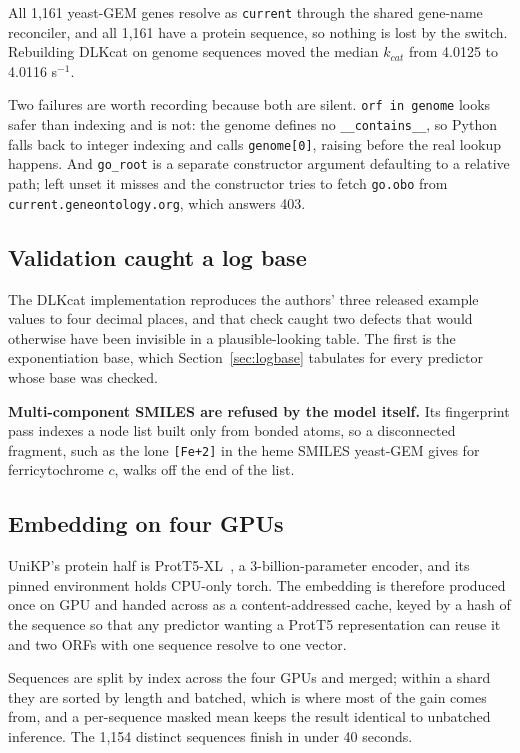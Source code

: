 All 1{,}161 yeast-GEM genes resolve as \texttt{current} through the shared gene-name
reconciler, and all 1{,}161 have a protein sequence, so nothing is lost by the switch.
Rebuilding DLKcat on genome sequences moved the median $k_{cat}$ from 4.0125 to 4.0116
s$^{-1}$.

Two failures are worth recording because both are silent. \texttt{orf in genome} looks
safer than indexing and is not: the genome defines no \texttt{\_\_contains\_\_}, so Python
falls back to integer indexing and calls \texttt{genome[0]}, raising before the real lookup
happens. And \texttt{go\_root} is a separate constructor argument defaulting to a relative
path; left unset it misses and the constructor tries to fetch \texttt{go.obo} from
\texttt{current.geneontology.org}, which answers 403.

\subsection{Validation caught a log base}

The DLKcat implementation reproduces the authors' three released example values to four
decimal places, and that check caught two defects that would otherwise have been invisible
in a plausible-looking table. The first is the exponentiation base, which
Section~\ref{sec:logbase} tabulates for every predictor whose base was checked.

\textbf{Multi-component SMILES are refused by the model itself.} Its fingerprint pass
indexes a node list built only from bonded atoms, so a disconnected fragment, such as the
lone \texttt{[Fe+2]} in the heme SMILES yeast-GEM gives for ferricytochrome $c$, walks off
the end of the list.

\subsection{Embedding on four GPUs}

UniKP's protein half is ProtT5-XL~\cite{elnaggarProtTransUnderstandingLanguage2022}, a
3-billion-parameter encoder, and its pinned environment holds CPU-only torch. The embedding is therefore produced once on GPU and
handed across as a content-addressed cache, keyed by a hash of the sequence so that any
predictor wanting a ProtT5 representation can reuse it and two ORFs with one sequence
resolve to one vector.

Sequences are split by index across the four GPUs and merged; within a shard they are
sorted by length and batched, which is where most of the gain comes from, and a
per-sequence masked mean keeps the result identical to unbatched inference. The 1{,}154
distinct sequences finish in under 40 seconds.

